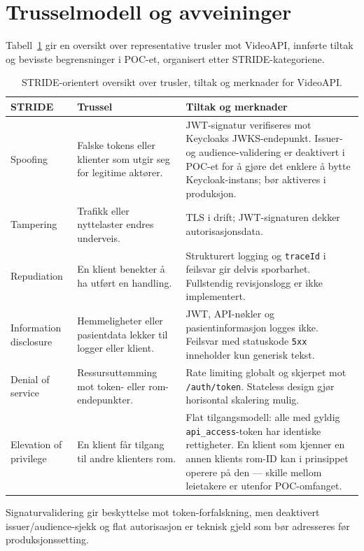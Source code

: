 \section{Trusselmodell og avveininger}
\label{sec:trusselmodell}

Tabell~\ref{tab:stride-videoapi} gir en oversikt over representative trusler mot
VideoAPI, innførte tiltak og bevisste begrensninger i POC-et,
organisert etter STRIDE-kategoriene.

\begin{table}[htbp]
\centering
\caption{STRIDE-orientert oversikt over trusler, tiltak og merknader for VideoAPI.}
\label{tab:stride-videoapi}
\begin{tabular}{p{2.8cm} p{5.0cm} p{7.2cm}}
\toprule
\textbf{STRIDE} & \textbf{Trussel} & \textbf{Tiltak og merknader} \\
\midrule

Spoofing &
Falske tokens eller klienter som utgir seg for legitime aktører. &
JWT-signatur verifiseres mot Keycloaks JWKS-endepunkt.
Issuer- og audience-validering er deaktivert i POC-et for å gjøre det enklere
å bytte Keycloak-instans; bør aktiveres i produksjon. \\

\addlinespace[6pt]

Tampering &
Trafikk eller nyttelaster endres underveis. &
TLS i drift; JWT-signaturen dekker autorisasjonsdata. \\

\addlinespace[6pt]

Repudiation &
En klient benekter å ha utført en handling. &
Strukturert logging og \texttt{traceId} i feilsvar gir delvis sporbarhet.
Fullstendig revisjonslogg er ikke implementert. \\

\addlinespace[6pt]

Information disclosure &
Hemmeligheter eller pasientdata lekker til logger eller klient. &
JWT, API-nøkler og pasientinformasjon logges ikke. Feilsvar med statuskode \texttt{5xx}
inneholder kun generisk tekst. \\

\addlinespace[6pt]

Denial of service &
Ressursuttømming mot token- eller rom-endepunkter. &
Rate limiting globalt og skjerpet mot \texttt{/auth/token}.
Stateless design gjør horisontal skalering mulig. \\

\addlinespace[6pt]

Elevation of privilege &
En klient får tilgang til andre klienters rom. &
Flat tilgangsmodell: alle med gyldig \texttt{api\_access}-token
har identiske rettigheter. En klient som kjenner en annen klients
rom-ID kan i prinsippet operere på den — skille mellom leietakere
er utenfor POC-omfanget. \\

\bottomrule
\end{tabular}
\end{table}

Signaturvalidering gir beskyttelse mot token-forfalskning, men deaktivert
issuer/audience-sjekk og flat autorisasjon er teknisk gjeld som bør adresseres
før produksjonssetting.